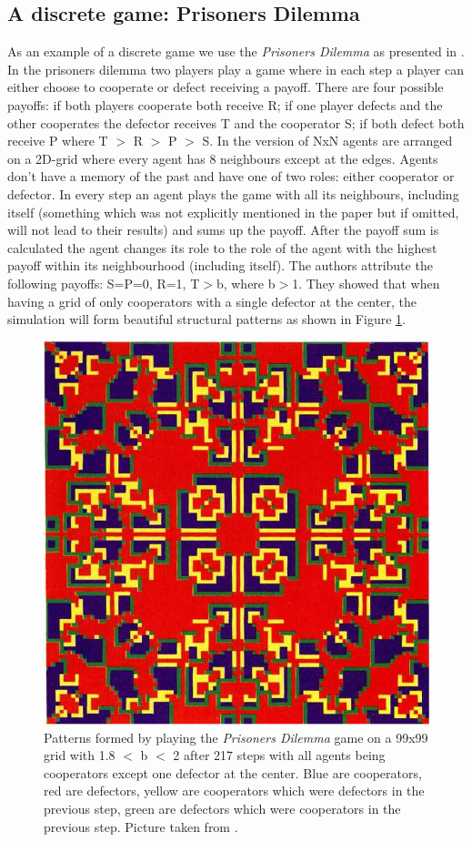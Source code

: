 \subsection{A discrete game: Prisoners Dilemma}
As an example of a discrete game we use the \textit{Prisoners Dilemma} as presented in \cite{nowak_evolutionary_1992}. In the prisoners dilemma two players play a game where in each step a player can either choose to cooperate or defect receiving a payoff. There are four possible payoffs: if both players cooperate both receive R; if one player defects and the other cooperates the defector receives T and the cooperator S; if both defect both receive P where T $>$ R $>$ P $>$ S.
In the version of \cite{nowak_evolutionary_1992} NxN agents are arranged on a 2D-grid where every agent has 8 neighbours except at the edges. Agents don't have a memory of the past and have one of two roles: either cooperator or defector. In every step an agent plays the game with all its neighbours, including itself (something which was not explicitly mentioned in the paper but if omitted, will not lead to their results) and sums up the payoff. After the payoff sum is calculated the agent changes its role to the role of the agent with the highest payoff within its neighbourhood (including itself). The authors attribute the following payoffs: S=P=0, R=1, T$>$b, where b$>$1. They showed that when having a grid of only cooperators with a single defector at the center, the simulation will form beautiful structural patterns as shown in Figure \ref{fig:sync_patterns}.

\begin{figure}
	\centering
	\includegraphics[width=.4\textwidth, angle=0]{./fig/sync_patterns.png}
	\caption{Patterns formed by playing the \textit{Prisoners Dilemma} game on a 99x99 grid with 1.8 $<$ b $<$ 2 after 217 steps with all agents being cooperators except one defector at the center. Blue are cooperators, red are defectors, yellow are cooperators which were defectors in the previous step, green are defectors which were cooperators in the previous step. Picture taken from \cite{nowak_evolutionary_1992}.}
	\label{fig:sync_patterns}
\end{figure}

